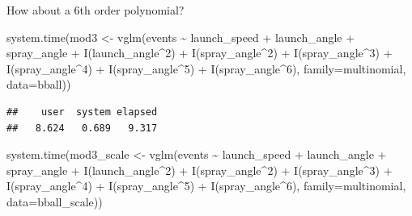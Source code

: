 \documentclass[
  ignorenonframetext,
]{beamer}
\newenvironment{Shaded}{\begin{snugshade}}{\end{snugshade}}
\newcommand{\AttributeTok}[1]{\textcolor[rgb]{0.77,0.63,0.00}{#1}}
\newcommand{\DecValTok}[1]{\textcolor[rgb]{0.00,0.00,0.81}{#1}}
\newcommand{\FunctionTok}[1]{\textcolor[rgb]{0.00,0.00,0.00}{#1}}
\newcommand{\NormalTok}[1]{#1}
\newcommand{\OtherTok}[1]{\textcolor[rgb]{0.56,0.35,0.01}{#1}}
\newcommand{\SpecialCharTok}[1]{\textcolor[rgb]{0.00,0.00,0.00}{#1}}
\begin{document}
\begin{frame}[fragile]{}
\protect\hypertarget{section-12}{}
How about a 6th order polynomial?

\vspace{12pt}
\tiny

\begin{Shaded}
\begin{Highlighting}[]
\FunctionTok{system.time}\NormalTok{(mod3 }\OtherTok{\textless{}{-}} \FunctionTok{vglm}\NormalTok{(events }\SpecialCharTok{\textasciitilde{}}\NormalTok{ launch\_speed }\SpecialCharTok{+}\NormalTok{ launch\_angle }\SpecialCharTok{+}\NormalTok{ spray\_angle }\SpecialCharTok{+} 
               \FunctionTok{I}\NormalTok{(launch\_angle}\SpecialCharTok{\^{}}\DecValTok{2}\NormalTok{) }\SpecialCharTok{+} \FunctionTok{I}\NormalTok{(spray\_angle}\SpecialCharTok{\^{}}\DecValTok{2}\NormalTok{) }\SpecialCharTok{+} \FunctionTok{I}\NormalTok{(spray\_angle}\SpecialCharTok{\^{}}\DecValTok{3}\NormalTok{) }\SpecialCharTok{+} 
               \FunctionTok{I}\NormalTok{(spray\_angle}\SpecialCharTok{\^{}}\DecValTok{4}\NormalTok{) }\SpecialCharTok{+} \FunctionTok{I}\NormalTok{(spray\_angle}\SpecialCharTok{\^{}}\DecValTok{5}\NormalTok{) }\SpecialCharTok{+} \FunctionTok{I}\NormalTok{(spray\_angle}\SpecialCharTok{\^{}}\DecValTok{6}\NormalTok{),}
             \AttributeTok{family=}\NormalTok{multinomial, }\AttributeTok{data=}\NormalTok{bball))}
\end{Highlighting}
\end{Shaded}

\begin{verbatim}
##    user  system elapsed 
##   8.624   0.689   9.317
\end{verbatim}

\begin{Shaded}
\begin{Highlighting}[]
\FunctionTok{system.time}\NormalTok{(mod3\_scale }\OtherTok{\textless{}{-}} \FunctionTok{vglm}\NormalTok{(events }\SpecialCharTok{\textasciitilde{}}\NormalTok{ launch\_speed }\SpecialCharTok{+}\NormalTok{ launch\_angle }\SpecialCharTok{+}\NormalTok{ spray\_angle }\SpecialCharTok{+} 
               \FunctionTok{I}\NormalTok{(launch\_angle}\SpecialCharTok{\^{}}\DecValTok{2}\NormalTok{) }\SpecialCharTok{+} \FunctionTok{I}\NormalTok{(spray\_angle}\SpecialCharTok{\^{}}\DecValTok{2}\NormalTok{) }\SpecialCharTok{+} \FunctionTok{I}\NormalTok{(spray\_angle}\SpecialCharTok{\^{}}\DecValTok{3}\NormalTok{) }\SpecialCharTok{+} 
               \FunctionTok{I}\NormalTok{(spray\_angle}\SpecialCharTok{\^{}}\DecValTok{4}\NormalTok{) }\SpecialCharTok{+} \FunctionTok{I}\NormalTok{(spray\_angle}\SpecialCharTok{\^{}}\DecValTok{5}\NormalTok{) }\SpecialCharTok{+} \FunctionTok{I}\NormalTok{(spray\_angle}\SpecialCharTok{\^{}}\DecValTok{6}\NormalTok{), }
             \AttributeTok{family=}\NormalTok{multinomial, }\AttributeTok{data=}\NormalTok{bball\_scale))}
\end{Highlighting}
\end{Shaded}


\end{frame}
\end{document}
